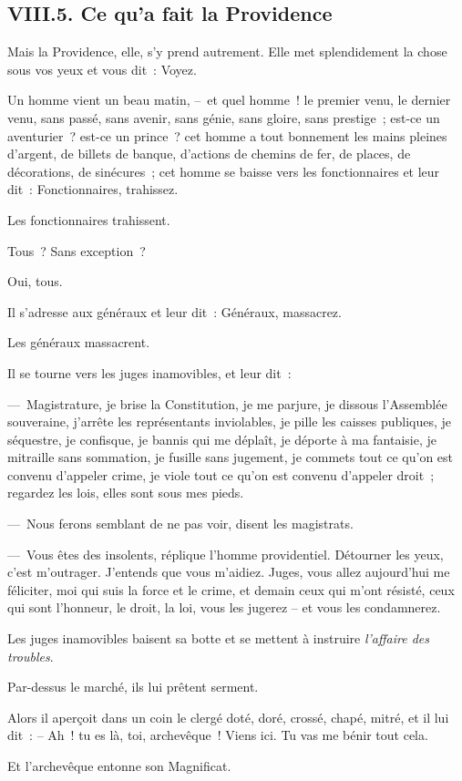 \documentclass[french,twoside]{book} %
\begin{document}
\subsection[{VIII.5. Ce qu’a fait la Providence}]{VIII.5. Ce qu’a fait la Providence}
\noindent Mais la Providence, elle, s’y prend autrement. Elle met splendidement la chose sous vos yeux et vous dit : Voyez.\par
Un homme vient un beau matin, – et quel homme ! le premier venu, le dernier venu, sans passé, sans avenir, sans génie, sans gloire, sans prestige ; est-ce un aventurier ? est-ce un prince ? cet homme a tout bonnement les mains pleines d’argent, de billets de banque, d’actions de chemins de fer, de places, de décorations, de sinécures ; cet homme se baisse vers les fonctionnaires et leur dit : Fonctionnaires, trahissez.\par
Les fonctionnaires trahissent.\par
Tous ? Sans exception ?\par
Oui, tous.\par
Il s’adresse aux généraux et leur dit : Généraux, massacrez.\par
Les généraux massacrent.\par
Il se tourne vers les juges inamovibles, et leur dit :\par
— Magistrature, je brise la Constitution, je me parjure, je dissous l’Assemblée souveraine, j’arrête les représentants inviolables, je pille les caisses publiques, je séquestre, je confisque, je bannis qui me déplaît, je déporte à ma fantaisie, je mitraille sans sommation, je fusille sans jugement, je commets tout ce qu’on est convenu d’appeler crime, je viole tout ce qu’on est convenu d’appeler droit ; regardez les lois, elles sont sous mes pieds.\par
— Nous ferons semblant de ne pas voir, disent les magistrats.\par
— Vous êtes des insolents, réplique l’homme providentiel. Détourner les yeux, c’est m’outrager. J’entends que vous m’aidiez. Juges, vous allez aujourd’hui me féliciter, moi qui suis la force et le crime, et demain ceux qui m’ont résisté, ceux qui sont l’honneur, le droit, la loi, vous les jugerez – et vous les condamnerez.\par
Les juges inamovibles baisent sa botte et se mettent à instruire \emph{l’affaire des troubles}.\par
Par-dessus le marché, ils lui prêtent serment.\par
Alors il aperçoit dans un coin le clergé doté, doré, crossé, chapé, mitré, et il lui dit : – Ah ! tu es là, toi, archevêque ! Viens ici. Tu vas me bénir tout cela.\par
Et l’archevêque entonne son Magnificat.
\end{document}
